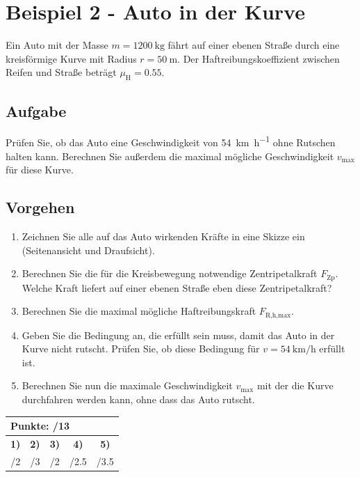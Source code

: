 \documentclass[11pt, a4paper]{article}
\begin{document}
\newpage
\null
\thispagestyle{empty}
\newpage

\section*{Beispiel 2 - Auto in der Kurve}

Ein Auto mit der Masse $m = \SI{1200}{\kilogram}$ fährt auf einer ebenen Straße durch eine kreisförmige Kurve mit Radius $r = \SI{50}{\metre}$. Der Haftreibungskoeffizient zwischen Reifen und Straße beträgt $\mu_{\text{H}} = \num{0.55}$.

\subsection*{Aufgabe}
Prüfen Sie, ob das Auto eine Geschwindigkeit von \SI{54}{\kilo\metre\per\hour} ohne Rutschen halten kann. Berechnen Sie außerdem die maximal mögliche Geschwindigkeit $v_{\text{max}}$ für diese Kurve.

\subsection*{Vorgehen}
\begin{enumerate}
    \item Zeichnen Sie alle auf das Auto wirkenden Kräfte in eine Skizze ein (Seitenansicht und Draufsicht).
    \item Berechnen Sie die für die Kreisbewegung notwendige Zentripetalkraft $F_{\text{Zp}}$. Welche Kraft liefert auf einer ebenen Straße eben diese Zentripetalkraft? 
    \item Berechnen Sie die maximal mögliche Haftreibungskraft $F_{\text{R,h,max}}$.
    \item Geben Sie die Bedingung an, die erfüllt sein muss, damit das Auto in der Kurve nicht rutscht. Prüfen Sie, ob diese Bedingung für $v = \SI{54}{\kilo\metre\per\hour}$ erfüllt ist.
    \item Berechnen Sie nun die maximale Geschwindigkeit $v_{\text{max}}$ mit der die Kurve durchfahren werden kann, ohne dass das Auto rutscht.
\end{enumerate}

\vfill
\begin{flushright}
\renewcommand{\arraystretch}{1.23}
\begin{tabular}{| c | c | c | c | c |}
\hline
\multicolumn{5}{|l|}{\textbf{\large{Punkte: \quad\quad\quad /13}}}\\
\hline
\textbf{1)} & \textbf{2)} & \textbf{3)} & \textbf{4)} & \textbf{5)} \\
\quad/2 & \quad/3 & \quad/2 & \quad/2.5 & \quad/3.5 \\
\hline
\end{tabular}
\end{flushright}
\end{document}
